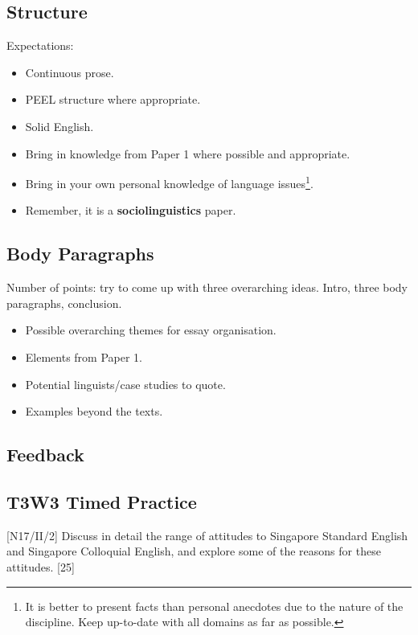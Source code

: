 \documentclass[../main.tex]{subfiles}
\begin{document}
    \subsection{Structure}
    Expectations:
    \begin{itemize}
        \item Continuous prose.
        \item PEEL structure where appropriate.
        \item Solid English.
        \item Bring in knowledge from Paper 1 where possible and appropriate.
        \item Bring in your own personal knowledge of language issues\footnote{It is better to present facts than personal anecdotes due to the nature of the discipline. Keep up-to-date with all domains as far as possible.}.
        \item Remember, it is a \textbf{sociolinguistics} paper.
    \end{itemize}
    
    \subsection{Body Paragraphs}
        Number of points: try to come up with three overarching ideas. Intro, three body paragraphs, conclusion. 
        \begin{itemize}
            \item Possible overarching themes for essay organisation.
            \item Elements from Paper 1.
            \item Potential linguists/case studies to quote.
            \item Examples beyond the texts.
        \end{itemize}

    \subsection{Feedback}
        \subsection*{T3W3 Timed Practice}
        [N17/II/2] Discuss in detail the range of attitudes to Singapore Standard English and Singapore Colloquial English, and explore some of the reasons for these attitudes. \hfill [25]
\end{document}
